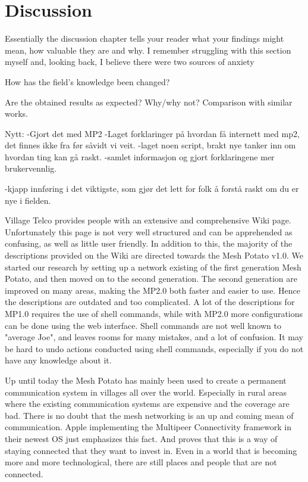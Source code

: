 \chapter{Discussion}
\label{chp:discussion} 

Essentially the discussion chapter tells your reader what your findings might mean, how valuable they are and why. I remember struggling with this section myself and, looking back, I believe there were two sources of anxiety

How has the field's knowledge been changed?

Are the obtained results as expected? Why/why not?
Comparison with similar works. 

Nytt:
-Gjort det med MP2
-Laget forklaringer på hvordan få internett med mp2, det finnes ikke fra før såvidt vi veit. 
-laget noen script, brakt nye tanker inn om hvordan ting kan gå raskt. 
-samlet informasjon og gjort forklaringene mer brukervennlig.

-kjapp innføring i det viktigste, som gjør det lett for folk å forstå raskt om du er nye i fielden. 

Village Telco provides people with an extensive and comprehensive Wiki page. Unfortunately this page is not very well structured and can be apprehended as confusing, as well as little user friendly. In addition to this, the majority of the descriptions provided on the Wiki are directed towards the Mesh Potato v1.0. We started our research by setting up a network existing of the first generation Mesh Potato, and then moved on to the second generation. The second generation are improved on many areas, making the MP2.0 both faster and easier to use. Hence the descriptions are outdated and too complicated. A lot of the descriptions for MP1.0 requires the use of shell commands, while with MP2.0 more configurations can be done using the web interface. Shell commands are not well known to "average Joe", and leaves rooms for many mistakes, and a lot of confusion. It may be hard to undo actions conducted using shell commands, especially if you do not have any knowledge about it. 

Up until today the Mesh Potato has mainly been used to create a permanent communication system in villages all over the world. Especially in rural areas where the existing communication systems are expensive and the coverage are bad. There is no doubt that the mesh networking is an up and coming mean of communication. Apple implementing the Multipeer Connectivity framework in their newest OS just emphasizes this fact. And proves that this is a way of staying connected that they want to invest in. Even in a world that is becoming more and more technological, there are still places and people that are not connected.

